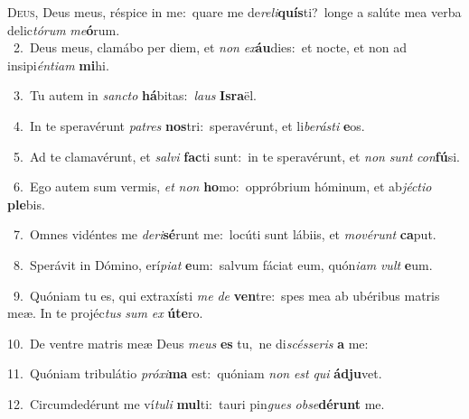 \lettrine{\initial\textcolor{\initialcolor}{D}}{eus,} Deus meus, réspice in me:~\dagger quare me de\-\textit{re}\-\textit{li}\textbf{quís}ti?~\star longe a salúte mea verba delic\-\textit{tó}\-\textit{rum} \textit{me}\-\textbf{ó}rum.\\
{\numbfont\textcolor{\numbcolor}{~2.}}~Deus meus, clamábo per diem, et \textit{non} \textit{ex}\-\textbf{áu}dies:~\star et nocte, et non ad insipi\-\textit{én}\-\textit{ti}\textit{am} \textbf{mi}\-hi.\par
{\numbfont\textcolor{\numbcolor}{~3.}}~Tu autem in \textit{sanc}\-\textit{to} \textbf{há}\-bitas:~\star \textit{laus} \textbf{Is}\-\textbf{ra}ël.\par
{\numbfont\textcolor{\numbcolor}{~4.}}~In te speravérunt \textit{pa}\-\textit{tres} \textbf{nos}\-tri:~\star speravérunt, et li\-\textit{be}\-\textit{rás}\textit{ti} \textbf{e}\-os.\par
{\numbfont\textcolor{\numbcolor}{~5.}}~Ad te clamavérunt, et \textit{sal}\-\textit{vi} \textbf{fac}\-ti sunt:~\star in te speravérunt, et \textit{non} \textit{sunt} \textit{con}\-\textbf{fú}si.\par
{\numbfont\textcolor{\numbcolor}{~6.}}~Ego autem sum vermis, \textit{et} \textit{non} \textbf{ho}\-mo:~\star oppróbrium hóminum, et ab\-\textit{jéc}\-\textit{ti}\textit{o} \textbf{ple}\-bis.\par
{\numbfont\textcolor{\numbcolor}{~7.}}~Omnes vidéntes me \textit{de}\-\textit{ri}\textbf{sé}runt me:~\star locúti sunt lábiis, et \textit{mo}\-\textit{vé}\textit{runt} \textbf{ca}\-put.\par
{\numbfont\textcolor{\numbcolor}{~8.}}~Sperávit in Dómino, erí\-\textit{pi}\-\textit{at} \textbf{e}\-um:~\star salvum fáciat eum, quón\-\textit{i}\-\textit{am} \textit{vult} \textbf{e}\-um.\par
{\numbfont\textcolor{\numbcolor}{~9.}}~Quóniam tu es, qui extraxísti \textit{me} \textit{de} \textbf{ven}\-tre:~\star spes mea ab ubéribus matris meæ. In te projéc\textit{tus} \textit{sum} \textit{ex} \textbf{ú}\-\textbf{te}ro.\par
{\numbfont\textcolor{\numbcolor}{10.}}~De ventre matris meæ Deus \textit{me}\-\textit{us} \textbf{es} tu,~\star ne di\-\textit{scés}\-\textit{se}\textit{ris} \textbf{a} me:\par
{\numbfont\textcolor{\numbcolor}{11.}}~Quóniam tribulátio \textit{pró}\-\textit{xi}\textbf{ma} est:~\star quóniam \textit{non} \textit{est} \textit{qui} \textbf{ád}\-\textbf{ju}vet.\par
{\numbfont\textcolor{\numbcolor}{12.}}~Circumdedérunt me ví\-\textit{tu}\-\textit{li} \textbf{mul}\-ti:~\star tauri pin\textit{gues} \textit{ob}\-\textit{se}\textbf{dé}\textbf{runt} me.\par
